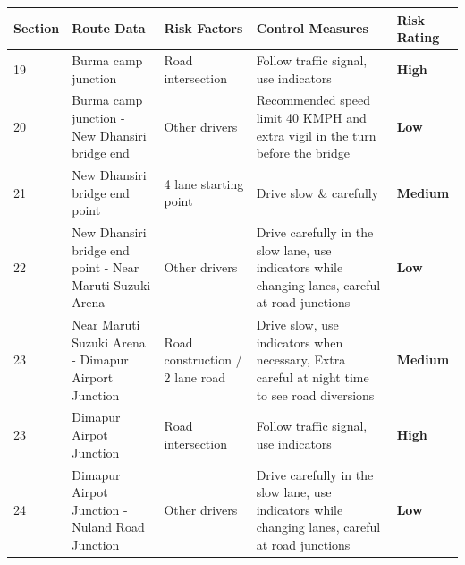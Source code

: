 \documentclass[paper=letter, fontsize=12pt]{article}
\begin{document}
\begin{tabular}{ |p{0.5cm}|p{2.5cm}|p{2cm}|p{3cm}|p{1cm}|  }
\hline
Section & Route Data &Risk Factors & Control Measures& Risk Rating \\
\hline

19 & Burma camp junction& Road intersection & Follow traffic signal, use indicators& \cellcolor[HTML]{FF0000} \textbf{High}\\
\hline

20 & Burma camp junction - New Dhansiri bridge end & Other drivers & Recommended speed limit 40 KMPH and extra vigil in the turn before the bridge & \cellcolor[HTML]{00CC00} \textbf{Low}\\
\hline

21 & New Dhansiri bridge end point& 4 lane starting point  & Drive slow \& carefully& \cellcolor[HTML]{FFCC00} \textbf{Medium}\\
\hline

22 & New Dhansiri bridge end point - Near Maruti Suzuki Arena& Other drivers  & Drive carefully in the slow lane, use indicators while changing lanes, careful at road junctions& \cellcolor[HTML]{00CC00} \textbf{Low}\\
\hline

23 & Near Maruti Suzuki Arena - Dimapur Airport Junction& Road construction / 2 lane road  & Drive slow, use indicators when necessary, Extra careful at night time to see road diversions & \cellcolor[HTML]{FFCC00} \textbf{Medium}\\
\hline

23 & Dimapur Airpot Junction& Road intersection & Follow traffic signal, use indicators& \cellcolor[HTML]{FF0000} \textbf{High}\\
\hline

24 & Dimapur Airpot Junction - Nuland Road Junction& Other drivers  & Drive carefully in the slow lane, use indicators while changing lanes, careful at road junctions& \cellcolor[HTML]{00CC00} \textbf{Low}\\
\hline



\hline
\end{tabular}
\end{document}
